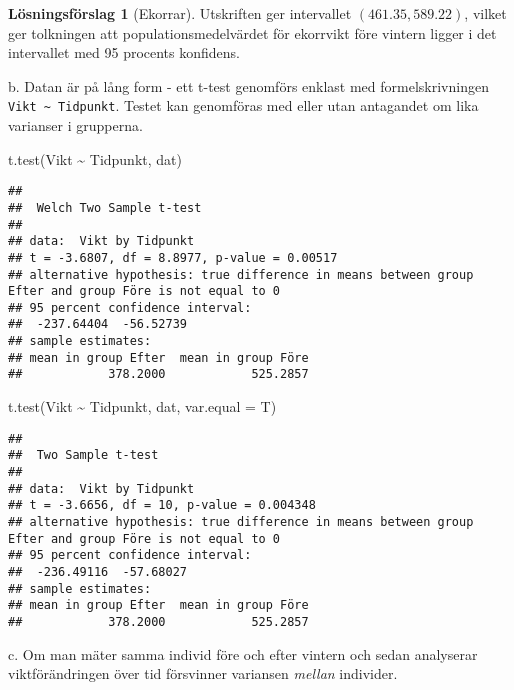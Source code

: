 \documentclass[
]{book}
\newenvironment{Shaded}{\begin{snugshade}}{\end{snugshade}}
\newcommand{\AttributeTok}[1]{\textcolor[rgb]{0.77,0.63,0.00}{#1}}
\newcommand{\FunctionTok}[1]{\textcolor[rgb]{0.00,0.00,0.00}{#1}}
\newcommand{\NormalTok}[1]{#1}
\newcommand{\SpecialCharTok}[1]{\textcolor[rgb]{0.00,0.00,0.00}{#1}}
\theoremstyle{definition}
\theoremstyle{definition}
\theoremstyle{definition}
\theoremstyle{definition}
\newtheorem{hypothesis}{Lösningsförslag}[chapter]
\theoremstyle{remark}
\begin{document}
\begin{hypothesis}[Ekorrar]
Utskriften ger intervallet \((461.35, 589.22)\), vilket ger tolkningen att populationsmedelvärdet för ekorrvikt före vintern ligger i det intervallet med 95 procents konfidens.

b. Datan är på lång form - ett t-test genomförs enklast med formelskrivningen \texttt{Vikt\ \textasciitilde{}\ Tidpunkt}. Testet kan genomföras med eller utan antagandet om lika varianser i grupperna.

\begin{Shaded}
\begin{Highlighting}[]
\FunctionTok{t.test}\NormalTok{(Vikt }\SpecialCharTok{\textasciitilde{}}\NormalTok{ Tidpunkt, dat)}
\end{Highlighting}
\end{Shaded}

\begin{verbatim}
## 
##  Welch Two Sample t-test
## 
## data:  Vikt by Tidpunkt
## t = -3.6807, df = 8.8977, p-value = 0.00517
## alternative hypothesis: true difference in means between group Efter and group Före is not equal to 0
## 95 percent confidence interval:
##  -237.64404  -56.52739
## sample estimates:
## mean in group Efter  mean in group Före 
##            378.2000            525.2857
\end{verbatim}

\begin{Shaded}
\begin{Highlighting}[]
\FunctionTok{t.test}\NormalTok{(Vikt }\SpecialCharTok{\textasciitilde{}}\NormalTok{ Tidpunkt, dat, }\AttributeTok{var.equal =}\NormalTok{ T)}
\end{Highlighting}
\end{Shaded}

\begin{verbatim}
## 
##  Two Sample t-test
## 
## data:  Vikt by Tidpunkt
## t = -3.6656, df = 10, p-value = 0.004348
## alternative hypothesis: true difference in means between group Efter and group Före is not equal to 0
## 95 percent confidence interval:
##  -236.49116  -57.68027
## sample estimates:
## mean in group Efter  mean in group Före 
##            378.2000            525.2857
\end{verbatim}

c. Om man mäter samma individ före och efter vintern och sedan analyserar viktförändringen över tid försvinner variansen \emph{mellan} individer.
\end{hypothesis}
\end{document}
